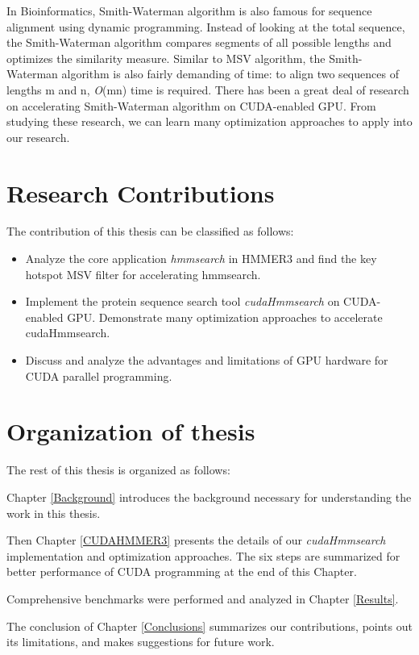In Bioinformatics, Smith-Waterman algorithm is also famous for sequence alignment using dynamic programming. Instead of looking at the total sequence, the Smith-Waterman algorithm compares segments of all possible lengths and optimizes the similarity measure. Similar to MSV algorithm, the Smith-Waterman algorithm is also fairly demanding of time: to align two sequences of lengths m and n, \emph{O}(mn) time is required. There has been a great deal of research on accelerating Smith-Waterman algorithm on CUDA-enabled GPU. From studying these research, we can learn many optimization approaches to apply into our research.

\section{Research Contributions}
The contribution of this thesis can be classified as follows:
\begin{itemize}
 \item Analyze the core application \emph{hmmsearch} in HMMER3 and find the key hotspot MSV filter for accelerating hmmsearch.
 \item Implement the protein sequence search tool \emph{cudaHmmsearch} on CUDA-enabled GPU. Demonstrate many optimization approaches to accelerate cudaHmmsearch.
 \item Discuss and analyze the advantages and limitations of GPU hardware for CUDA parallel programming.
\end{itemize}

\section{Organization of thesis}
The rest of this thesis is organized as follows:

Chapter \ref{Background} introduces the background necessary for understanding the work in this thesis.

Then Chapter \ref{CUDAHMMER3} presents the details of our \emph{cudaHmmsearch} implementation and optimization approaches. The six steps are summarized for better performance of CUDA programming at the end of this Chapter.

Comprehensive benchmarks were performed and analyzed in Chapter \ref{Results}. 

The conclusion of Chapter \ref{Conclusions} summarizes our contributions, points out its limitations, and makes suggestions for future work.

